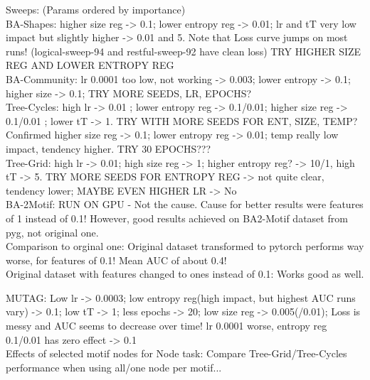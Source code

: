 Sweeps: (Params ordered by importance)\\
BA-Shapes: higher size reg -> 0.1; lower entropy reg -> 0.01; lr and tT very low impact but slightly higher -> 0.01 and 5. Note that Loss curve jumps on most runs! (logical-sweep-94 and restful-sweep-92 have clean loss) TRY HIGHER SIZE REG AND LOWER ENTROPY REG \\

BA-Community: lr 0.0001 too low, not working -> 0.003; lower entropy -> 0.1; higher size -> 0.1; TRY MORE SEEDS, LR, EPOCHS? \\

Tree-Cycles: high lr -> 0.01 ; lower entropy reg -> 0.1/0.01; higher size reg -> 0.1/0.01 ; lower tT -> 1. TRY WITH MORE SEEDS FOR ENT, SIZE, TEMP? Confirmed higher size reg -> 0.1; lower entropy reg -> 0.01; temp really low impact, tendency higher. TRY 30 EPOCHS???\\

Tree-Grid: high lr -> 0.01; high size reg -> 1; higher entropy reg? -> 10/1, high tT -> 5. TRY MORE SEEDS FOR ENTROPY REG -> not quite clear, tendency lower; MAYBE EVEN HIGHER LR -> No\\

BA-2Motif: RUN ON GPU - Not the cause. Cause for better results were features of 1 instead of 0.1! However, good results achieved on BA2-Motif dataset from pyg, not original one.\\
Comparison to orginal one: Original dataset transformed to pytorch performs way worse, for features of 0.1! Mean AUC of about 0.4! \\
Original dataset with features changed to ones instead of 0.1: Works good as well.

MUTAG: Low lr -> 0.0003; low entropy reg(high impact, but highest AUC runs vary) -> 0.1; low tT -> 1; less epochs -> 20; low size reg -> 0.005(/0.01); Loss is messy and AUC seems to decrease over time! lr 0.0001 worse, entropy reg 0.1/0.01 has zero effect -> 0.1\\


 Effects of selected motif nodes for Node task: Compare Tree-Grid/Tree-Cycles performance when using all/one node per motif...